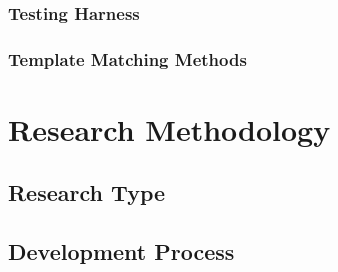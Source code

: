 \subsubsection{Testing Harness}

\subsubsection{Template Matching Methods}

\section{Research Methodology}

\subsection{Research Type}

\subsection{Development Process}



